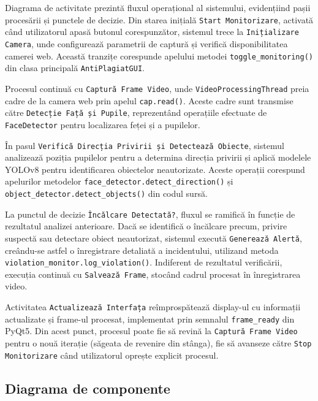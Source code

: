 \documentclass[12pt,a4paper]{article}
\begin{document}
Diagrama de activitate prezintă fluxul operațional al sistemului, evidențiind pașii procesării și punctele de decizie. Din starea inițială \texttt{Start Monitorizare}, activată când utilizatorul apasă butonul corespunzător, sistemul trece la \texttt{Inițializare Camera}, unde configurează parametrii de captură și verifică disponibilitatea camerei web. Această tranzițe corespunde apelului metodei \texttt{toggle\_monitoring()} din clasa principală \texttt{AntiPlagiatGUI}.

Procesul continuă cu \texttt{Captură Frame Video}, unde \texttt{VideoProcessingThread} preia cadre de la camera web prin apelul \texttt{cap.read()}. Aceste cadre sunt transmise către \texttt{Detecție Față și Pupile}, reprezentând operațiile efectuate de \texttt{FaceDetector} pentru localizarea feței și a pupilelor. 

În pasul \texttt{Verifică Direcția Privirii și Detectează Obiecte}, sistemul analizează poziția pupilelor pentru a determina direcția privirii și aplică modelele YOLOv8 pentru identificarea obiectelor neautorizate. Aceste operații corespund apelurilor metodelor \texttt{face\_detector.detect\_direction()} și \texttt{object\_detector.detect\_objects()} din codul sursă.

La punctul de decizie \texttt{Încălcare Detectată?}, fluxul se ramifică în funcție de rezultatul analizei anterioare. Dacă se identifică o încălcare precum, privire suspectă sau detectare obiect neautorizat, sistemul execută \texttt{Generează Alertă}, creându-se astfel o înregistrare detaliată a incidentului, utilizand metoda \texttt{violation\_monitor.log\_violation()}. Indiferent de rezultatul verificării, execuția continuă cu \texttt{Salvează Frame}, stocând cadrul procesat în înregistrarea video.

Activitatea \texttt{Actualizează Interfața} reîmprospătează display-ul cu informații actualizate și frame-ul procesat, implementat prin semnalul \texttt{frame\_ready} din PyQt5. Din acest punct, procesul poate fie să revină la \texttt{Captură Frame Video} pentru o nouă iterație (săgeata de revenire din stânga), fie să avanseze către \texttt{Stop Monitorizare} când utilizatorul oprește explicit procesul.

\subsection{Diagrama de componente}
\end{document}
